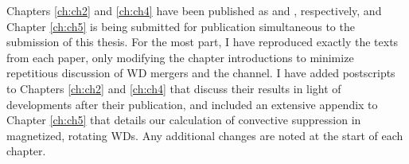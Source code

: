 Chapters \ref{ch:ch2} and \ref{ch:ch4} have been published as \cite{zhu+13} and \cite{zhu+15}, respectively, and Chapter \ref{ch:ch5} is being submitted for publication simultaneous to the submission of this thesis.  For the most part, I have reproduced exactly the texts from each paper, only modifying the chapter introductions to minimize repetitious discussion of WD mergers and the \citeal{vkercj10} channel.  I have added postscripts to Chapters \ref{ch:ch2} and \ref{ch:ch4} that discuss their results in light of developments after their publication, and included an extensive appendix to Chapter \ref{ch:ch5} that details our calculation of convective suppression in magnetized, rotating WDs.  Any additional changes are noted at the start of each chapter.

